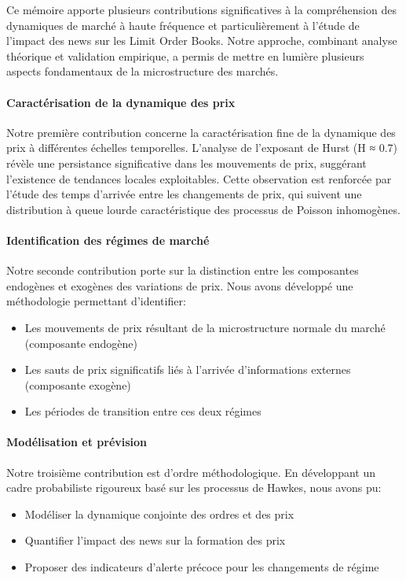 \documentclass[10pt,a4paper]{article}
\theoremstyle{definition}
\theoremstyle{remark}
\begin{document}
\begin{itemize}
Ce mémoire apporte plusieurs contributions significatives à la compréhension des dynamiques de marché à haute fréquence et particulièrement à l'étude de l'impact des news sur les Limit Order Books. Notre approche, combinant analyse théorique et validation empirique, a permis de mettre en lumière plusieurs aspects fondamentaux de la microstructure des marchés.

\paragraph{\textbf{Caractérisation de la dynamique des prix}} Notre première contribution concerne la caractérisation fine de la dynamique des prix à différentes échelles temporelles. L'analyse de l'exposant de Hurst (H ≈ 0.7) révèle une persistance significative dans les mouvements de prix, suggérant l'existence de tendances locales exploitables. Cette observation est renforcée par l'étude des temps d'arrivée entre les changements de prix, qui suivent une distribution à queue lourde caractéristique des processus de Poisson inhomogènes.

\paragraph{\textbf{Identification des régimes de marché}} Notre seconde contribution porte sur la distinction entre les composantes endogènes et exogènes des variations de prix. Nous avons développé une méthodologie permettant d'identifier:
\begin{itemize}
    \item Les mouvements de prix résultant de la microstructure normale du marché (composante endogène)
    \item Les sauts de prix significatifs liés à l'arrivée d'informations externes (composante exogène)
    \item Les périodes de transition entre ces deux régimes
\end{itemize}

\paragraph{\textbf{Modélisation et prévision}} Notre troisième contribution est d'ordre méthodologique. En développant un cadre probabiliste rigoureux basé sur les processus de Hawkes, nous avons pu:
\begin{itemize}
    \item Modéliser la dynamique conjointe des ordres et des prix
    \item Quantifier l'impact des news sur la formation des prix
    \item Proposer des indicateurs d'alerte précoce pour les changements de régime
\end{itemize}


\end{itemize}
\end{document}
